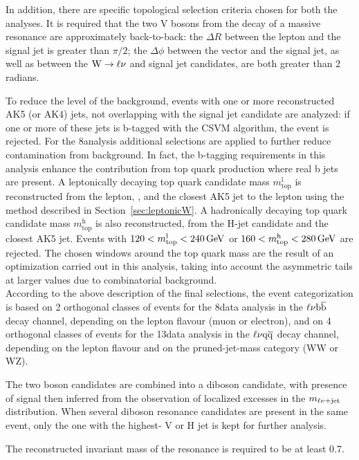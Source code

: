 In addition, there are specific topological selection criteria chosen for both the analyses. 
It is required that the two V bosons from the decay of a massive resonance are approximately back-to-back:
the $\Delta R$ between the lepton and the signal jet is greater than $\pi/2$; the $\Delta\phi$ between the vector \ptvecmiss and the signal jet,
as well as between the $\mathrm{W}\to\ell\nu$ and signal jet candidates, are both greater than 2 radians.

To reduce the level of the \ttbar background, events with one or more reconstructed AK5 (or AK4) jets, not overlapping with the signal jet candidate are analyzed:
if one or more of these jets is b-tagged with the CSVM algorithm, the event is rejected.
For the 8\TeV analysis additional selections are applied to further reduce contamination from \ttbar background.
In fact, the b-tagging requirements in this analysis enhance the contribution from top quark production where real b jets are present.
A leptonically decaying top quark candidate mass $m_\mathrm{top}^\mathrm{l}$ is reconstructed from the lepton, \ETmiss, and the closest AK5 jet to the lepton using the method described in Section~\ref{sec:leptonicW}.
A hadronically decaying top quark candidate mass $m_\mathrm{top}^\mathrm{h}$ is also reconstructed, from the H-jet candidate and the closest AK5 jet.
Events with $120 < m_\mathrm{top}^\mathrm{l} < 240\,\text{Ge\hspace{-.08em}V}$ or $160 < m_\mathrm{top}^\mathrm{h} < 280\,\text{Ge\hspace{-.08em}V}$ are rejected.
The chosen windows around the top quark mass are the result of an optimization carried out in this analysis, taking into account
the asymmetric tails at larger values due to combinatorial background.\\

According to the above description of the final selections, the event categorization is based on 2 orthogonal classes of events for the 8\TeV data analysis in the $\ell\nu{\mathrm{b}\overline{\mathrm{b}}}$ decay channel,
depending on the lepton flavour (muon or electron),
and on 4 orthogonal classes of events for the 13\TeV data analysis in the $\ell\nu\mathrm{q}\overline{\mathrm{q}}$ decay channel, depending on the lepton flavour and on the pruned-jet-mass category (WW or WZ).

The two boson candidates are combined into a diboson candidate, with presence of signal then inferred from the observation of localized excesses in the $m_{\ell\nu+{\rm jet}}$ distribution.
When several diboson resonance candidates are present in the same event, only the one with the highest-\pt
V or H jet is kept for further analysis.

The reconstructed invariant mass of the resonance is required to be at least 0.7\TeV.\\ 

